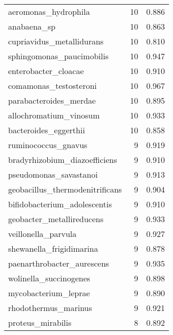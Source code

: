 \begin{tabular}{lrr}
                        aeromonas\_hydrophila &                  10 &     0.886 \\
                                 anabaena\_sp &                  10 &     0.863 \\
                   cupriavidus\_metallidurans &                  10 &     0.810 \\
                   sphingomonas\_paucimobilis &                  10 &     0.947 \\
                        enterobacter\_cloacae &                  10 &     0.910 \\
                      comamonas\_testosteroni &                  10 &     0.967 \\
                      parabacteroides\_merdae &                  10 &     0.895 \\
                      allochromatium\_vinosum &                  10 &     0.933 \\
                       bacteroides\_eggerthii &                  10 &     0.858 \\
                         ruminococcus\_gnavus &                   9 &     0.919 \\
               bradyrhizobium\_diazoefficiens &                   9 &     0.910 \\
                      pseudomonas\_savastanoi &                   9 &     0.913 \\
             geobacillus\_thermodenitrificans &                   9 &     0.904 \\
                bifidobacterium\_adolescentis &                   9 &     0.910 \\
                   geobacter\_metallireducens &                   9 &     0.933 \\
                         veillonella\_parvula &                   9 &     0.927 \\
                    shewanella\_frigidimarina &                   9 &     0.878 \\
                  paenarthrobacter\_aurescens &                   9 &     0.935 \\
                      wolinella\_succinogenes &                   9 &     0.898 \\
                        mycobacterium\_leprae &                   9 &     0.890 \\
                        rhodothermus\_marinus &                   9 &     0.921 \\
                           proteus\_mirabilis &                   8 &     0.892 \\

\end{tabular}
